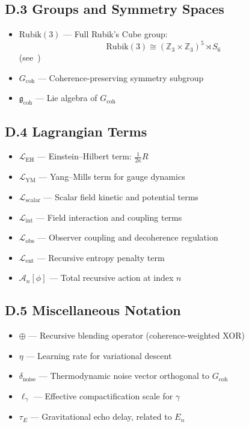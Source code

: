 \documentclass[11pt]{article}
\begin{document}
\subsection*{D.3 Groups and Symmetry Spaces}

\begin{itemize}[leftmargin=1.5em]
  \item $\text{Rubik}(3)$ — Full Rubik's Cube group:
  \[
  \text{Rubik}(3) \cong (\mathbb{Z}_3 \times \mathbb{Z}_3)^5 \rtimes S_6
  \]
  (see~\cite{joyner2008adventures})
  \item $G_{\text{coh}}$ — Coherence-preserving symmetry subgroup
  \item $\mathfrak{g}_{\text{coh}}$ — Lie algebra of $G_{\text{coh}}$
\end{itemize}


\subsection*{D.4 Lagrangian Terms}

\begin{itemize}[leftmargin=1.5em]
  \item $\mathcal{L}_{\text{EH}}$ — Einstein–Hilbert term: $\frac{1}{2\kappa} R$
  \item $\mathcal{L}_{\text{YM}}$ — Yang–Mills term for gauge dynamics
  \item $\mathcal{L}_{\text{scalar}}$ — Scalar field kinetic and potential terms
  \item $\mathcal{L}_{\text{int}}$ — Field interaction and coupling terms
  \item $\mathcal{L}_{\text{obs}}$ — Observer coupling and decoherence regulation
  \item $\mathcal{L}_{\text{ent}}$ — Recursive entropy penalty term
  \item $\mathcal{A}_n[\phi]$ — Total recursive action at index $n$
\end{itemize}

\subsection*{D.5 Miscellaneous Notation}

\begin{itemize}[leftmargin=1.5em]
  \item $\oplus$ — Recursive blending operator (coherence-weighted XOR)
  \item $\eta$ — Learning rate for variational descent
  \item $\delta_{\text{noise}}$ — Thermodynamic noise vector orthogonal to $G_{\text{coh}}$
  \item $\ell_\gamma$ — Effective compactification scale for $\gamma$
  \item $\tau_E$ — Gravitational echo delay, related to $E_n$
\end{itemize}
\end{document}
